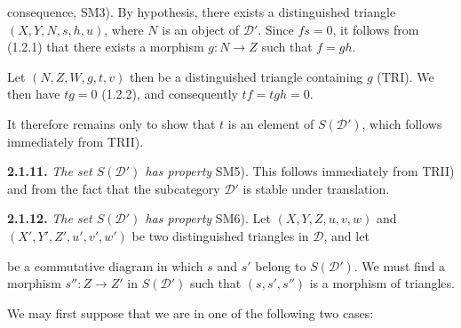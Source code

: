 \clearpage
{}%
\begingroup
\small
\setlength{\emergencystretch}{1.5em}%
\setlength{\abovedisplayskip}{2pt plus 1pt minus 1pt}%
\setlength{\belowdisplayskip}{2pt plus 1pt minus 1pt}%

\noindent consequence, SM3).
%
By hypothesis, there exists a distinguished
triangle $(X,Y,N,s,h,u)$, where $N$ is an object of $\mathcal D'$. Since
$fs=0$, it follows from (1.2.1) that there exists a morphism
$g\colon N\to Z$ such that $f=gh$.

Let $(N,Z,W,g,t,v)$ then be a distinguished triangle containing $g$ (TRI).
We then have $tg=0$ (1.2.2), and consequently $tf=tgh=0$.

It therefore remains only to show that $t$ is an element of $S(\mathcal D')$,
which follows immediately from TRII).

\medskip
\noindent\textbf{2.1.11.}\quad
{}
\emph{The set $S(\mathcal D')$ has property} SM5).
This follows immediately from TRII) and from the fact that the subcategory
$\mathcal D'$ is stable under translation.

\medskip
\noindent\textbf{2.1.12.}\quad
{}
\emph{The set $S(\mathcal D')$ has property} SM6).
Let $(X,Y,Z,u,v,w)$ and $(X',Y',Z',u',v',w')$ be two distinguished triangles
in $\mathcal D$, and let

\begin{center}
\end{center}

\noindent be a commutative diagram in which $s$ and $s'$ belong to
$S(\mathcal D')$. We must find a morphism $s''\colon Z\to Z'$ in
$S(\mathcal D')$ such that $(s,s',s'')$ is a morphism of triangles.

We may first suppose that we are in one of the following two cases:

